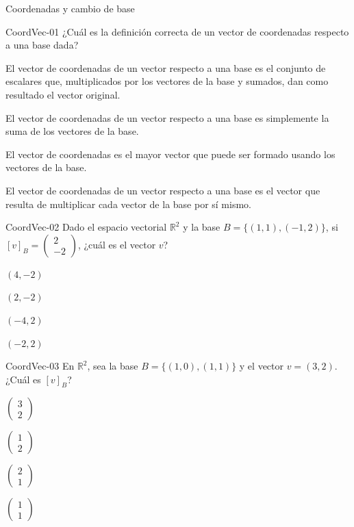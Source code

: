 \documentclass[a4,11pt]{aleph-notas}
\begin{document}
\begin{quiz}{Coordenadas y cambio de base}

\begin{multi}[]%
    {CoordVec-01}
    ¿Cuál es la definición correcta de un vector de coordenadas respecto a una base dada?
    \item* El vector de coordenadas de un vector respecto a una base es el conjunto de escalares que, multiplicados por los vectores de la base y sumados, dan como resultado el vector original.
    \item El vector de coordenadas de un vector respecto a una base es simplemente la suma de los vectores de la base.
    \item El vector de coordenadas es el mayor vector que puede ser formado usando los vectores de la base.
    \item El vector de coordenadas de un vector respecto a una base es el vector que resulta de multiplicar cada vector de la base por sí mismo.
\end{multi}


\begin{multi}[]%
    {CoordVec-02}
    Dado el espacio vectorial \( \mathbb{R}^2 \) y la base \( B = \{(1, 1), (-1, 2)\} \), si $[v]_B = \begin{pmatrix}2\\-2\end{pmatrix}$, ¿cuál es el vector $v$?
    \item* $(4, -2)$
    \item $(2,-2)$
    \item $(-4, 2)$
    \item $(-2,2)$
\end{multi}

\begin{multi}[]%
    {CoordVec-03}
    En \(\mathbb{R}^2\), sea la base \(B=\{(1,0),(1,1)\}\) y el vector \(v=(3,2)\). ¿Cuál es \([v]_B\)?
    \item $\begin{pmatrix}3\\2\end{pmatrix}$
    \item* $\begin{pmatrix}1\\2\end{pmatrix}$
    \item $\begin{pmatrix}2\\1\end{pmatrix}$
    \item $\begin{pmatrix}1\\1\end{pmatrix}$
\end{multi}


\end{quiz}
\end{document}
